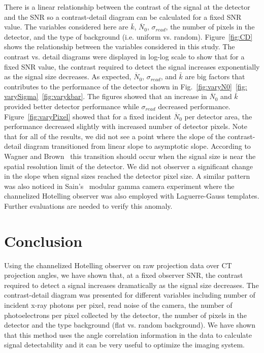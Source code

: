 \noindent
There is a linear relationship between the contrast of the signal at the detector and the SNR so a contrast-detail diagram can be calculated for a fixed SNR value.  The variables considered here are $\bar{k}$, $\overline{N}_0$, $\sigma_{read}$, the number of pixels in the detector, and the type of background (i.e. uniform vs. random).  Figure~\ref{fig:CD} shows the relationship between the variables considered in this study.  The contrast vs. detail diagrams were displayed in log-log scale to show that for a fixed SNR value, the contrast required to detect the signal increases exponentially as the signal size decreases.  As expected, $\overline{N}_0$, $\sigma_{read}$, and $\bar{k}$ are big factors that contributes to the performance of the detector shown in Fig.~\ref{fig:varyN0}~\ref{fig: varySigma}~\ref{fig:varykbar}.  The figures showed that an increase in  $\overline{N}_0$ and $\bar{k}$ provided better detector performance while $\sigma_{read}$ decreased performance.  Figure~\ref{fig:varyPixel} showed that for a fixed incident $\overline{N}_0$ per detector area, the performance decreased slightly with increased number of detector pixels.  Note that for all of the results, we did not see a point where the slope of the contrast-detail diagram transitioned from linear slope to asymptotic slope. According to Wagner and Brown~\citep{Wagner1979} this transition should occur when the signal size is near the spatial resolution limit of the detector.  We did not observer a significant change in the slope when signal sizes reached the detector pixel size.  A similar pattern was also noticed in Sain's~\citep{Sain2003} modular gamma camera experiment where the channelized Hotelling observer was also employed with Laguerre-Gauss templates.  Further evaluations are needed to verify this anomaly.

\section{Conclusion}
Using the channelized Hotelling observer on raw projection data over CT projection angles, we have shown that, at a fixed observer SNR, the contrast required to detect a signal increases dramatically as the signal size decreases.  The contrast-detail diagram was presented for different variables including number of incident x-ray photons per pixel, read noise of the camera, the number of photoelectrons per pixel collected by the detector, the number of pixels in the detector and the type background (flat vs. random background).  We have shown that this method uses the angle correlation information in the data to calculate signal detectability and it can be very useful to optimize the imaging system.